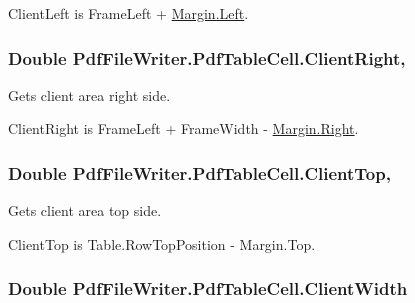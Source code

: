 Client\+Left is Frame\+Left + \hyperlink{namespace_pdf_file_writer_a3991bfacc8c7be240452dd24ec817157a945d5e233cf7d6240f6b783b36a374ff}{Margin.\+Left}. 
\subsubsection[{\texorpdfstring{Client\+Right}{ClientRight}}]{\setlength{\rightskip}{0pt plus 5cm}Double Pdf\+File\+Writer.\+Pdf\+Table\+Cell.\+Client\+Right\hspace{0.3cm}{\ttfamily [get]}, {\ttfamily [set]}}\hypertarget{class_pdf_file_writer_1_1_pdf_table_cell_add61148ee66bb413cc7be9bde66af08c}{}\label{class_pdf_file_writer_1_1_pdf_table_cell_add61148ee66bb413cc7be9bde66af08c}


Gets client area right side. 

Client\+Right is Frame\+Left + Frame\+Width -\/ \hyperlink{namespace_pdf_file_writer_a3991bfacc8c7be240452dd24ec817157a92b09c7c48c520c3c55e497875da437c}{Margin.\+Right}. 
\subsubsection[{\texorpdfstring{Client\+Top}{ClientTop}}]{\setlength{\rightskip}{0pt plus 5cm}Double Pdf\+File\+Writer.\+Pdf\+Table\+Cell.\+Client\+Top\hspace{0.3cm}{\ttfamily [get]}, {\ttfamily [set]}}\hypertarget{class_pdf_file_writer_1_1_pdf_table_cell_a626f13cc9a1c652d9953c415ef6286e1}{}\label{class_pdf_file_writer_1_1_pdf_table_cell_a626f13cc9a1c652d9953c415ef6286e1}


Gets client area top side. 

Client\+Top is Table.\+Row\+Top\+Position -\/ Margin.\+Top. 
\subsubsection[{\texorpdfstring{Client\+Width}{ClientWidth}}]{\setlength{\rightskip}{0pt plus 5cm}Double Pdf\+File\+Writer.\+Pdf\+Table\+Cell.\+Client\+Width\hspace{0.3cm}{\ttfamily [get]}}\hypertarget{class_pdf_file_writer_1_1_pdf_table_cell_a28f60183e871928f9b8e52ffa5637cd9}{}\label{class_pdf_file_writer_1_1_pdf_table_cell_a28f60183e871928f9b8e52ffa5637cd9}


